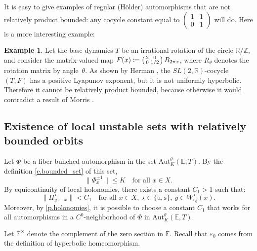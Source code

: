 \documentclass[10pt]{amsart}
\def\vcentcolon{\mathrel{\mathop\ordinarycolon}}
\providecommand\ordinarycolon{:}
\providecommand*\coloneqq{\vcentcolon\mathrel{\mkern-1.2mu}=}
\theoremstyle{plain}
\theoremstyle{definition}
\newtheorem{example}[theorem]{Example}
\newcommand{\RR}{\mathbb{R}}
\newcommand{\ZZ}{\mathbb{Z}}
\newcommand{\EE}{\mathbb{E}}
\newcommand{\SL}{\mathit{SL}}
\newcommand{\uu}{\mathrm{u}}
\renewcommand{\ss}{\mathrm{s}}
\newcommand{\Aut}{\mathrm{Aut}}
\let\epsilon\varepsilon
\begin{document}
It is easy to give examples of regular (\eg Hölder) automorphisms that are not relatively product bounded: any cocycle constant equal to $\left( \begin{smallmatrix} 1 & 1 \\ 0 & 1 \end{smallmatrix} \right)$ will do.
Here is a more interesting example:

\begin{example}\label{ex.Herman}
Let the base dynamics $T$ be an irrational rotation of the circle $\RR/\ZZ$, and consider the matrix-valued map $F(x) \coloneqq \left( \begin{smallmatrix} 2 & 0 \\ 0 & 1/2 \end{smallmatrix} \right) R_{2\pi x}$, where $R_\theta$ denotes the rotation matrix by angle~$\theta$. As shown by Herman \cite[p.\,471--473]{Herman}, the $\SL(2,\RR)$-cocycle $(T,F)$ has a positive Lyapunov exponent, but it is not uniformly hyperbolic. Therefore it cannot be relatively product bounded, because otherwise it would contradict a result of Morris \cite[Th.\,2.1]{Morris_rapidly}.
\end{example}

\subsection{Existence of local unstable sets with relatively bounded orbits}\label{ss.local_RPB}

Let $\Phi$ be a fiber-bunched automorphism in the set $\Aut^\theta_K(\EE,T)$.
By the definition \eqref{e.bounded_set} of this set,
\begin{equation}\label{e.bound_Phi}
\|\Phi^{\pm 1}_x\| \le K \quad \text{for all } x \in X.
\end{equation}
By equicontinuity of local holonomies, there exists a constant $C_1 > 1$ such that:
\begin{equation}\label{e.bound_H}
\|H^\star_{y \gets x}\| < C_1
\quad \text{for all } x \in X, \ \star \in \{\uu,\ss\}, \ y \in W^\star_{\epsilon_0}(x).
\end{equation}
Moreover, by \cref{p.holonomies}, it is possible to choose a constant $C_1$ that works for all automorphisms in a $C^0$-neighborhood of $\Phi$ in $\Aut^\theta_K(\EE,T)$.

Let $\EE^\times$ denote the complement of the zero section in $\EE$.
Recall that $\epsilon_0$ comes from the definition of hyperbolic homeomorphism.
\end{document}
